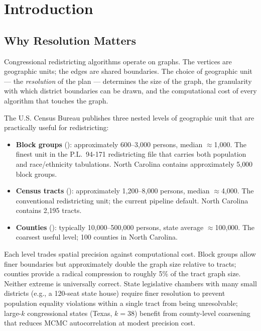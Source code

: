 \section{Introduction}
\label{sec:introduction}

\subsection{Why Resolution Matters}

Congressional redistricting algorithms operate on graphs.
The vertices are geographic units; the edges are shared boundaries.
The choice of geographic unit --- the \emph{resolution} of the plan ---
determines the size of the graph, the granularity with which district
boundaries can be drawn, and the computational cost of every algorithm
that touches the graph.

The U.S. Census Bureau publishes three nested levels of geographic
unit that are practically useful for redistricting:

\begin{itemize}
  \item \textbf{Block groups} (\bg{}): approximately 600--3{,}000 persons,
        median $\approx$1{,}000.
        The finest unit in the P.L.\ 94-171 redistricting file that carries
        both population and race/ethnicity tabulations.
        North Carolina contains approximately 5{,}000 block groups.
  \item \textbf{Census tracts} (\tract{}): approximately 1{,}200--8{,}000 persons,
        median $\approx$4{,}000.
        The conventional redistricting unit; the current pipeline default.
        North Carolina contains 2{,}195 tracts.
  \item \textbf{Counties} (\county{}): typically 10{,}000--500{,}000 persons,
        state average $\approx$100{,}000.
        The coarsest useful level; 100 counties in North Carolina.
\end{itemize}

\noindent
Each level trades spatial precision against computational cost.
Block groups allow finer boundaries but approximately double the graph size
relative to tracts; counties provide a radical compression to roughly 5\%
of the tract graph size.
Neither extreme is universally correct.
State legislative chambers with many small districts (e.g., a 120-seat
state house) require finer resolution to prevent population equality
violations within a single tract from being unresolvable; large-$k$
congressional states (Texas, $k=38$) benefit from county-level coarsening
that reduces MCMC autocorrelation at modest precision cost.

